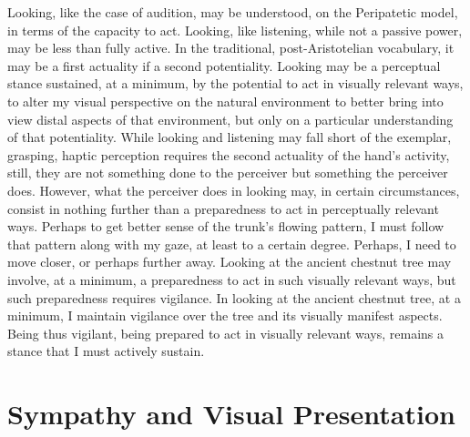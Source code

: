 Looking, like the case of audition, may be understood, on the Peripatetic model, in terms of the capacity to act. Looking, like listening, while not a passive power, may be less than fully active. In the traditional, post-Aristotelian vocabulary, it may be a first actuality if a second potentiality. Looking may be a perceptual stance sustained, at a minimum, by the potential to act in visually relevant ways, to alter my visual perspective on the natural environment to better bring into view distal aspects of that environment, but only on a particular understanding of that potentiality. While looking and listening may fall short of the exemplar, grasping, haptic perception requires the second actuality of the hand's activity, still, they are not something done to the perceiver but something the perceiver does. However, what the perceiver does in looking may, in certain circumstances, consist in nothing further than a preparedness to act in perceptually relevant ways. Perhaps to get better sense of the trunk's flowing pattern, I must follow that pattern along with my gaze, at least to a certain degree. Perhaps, I need to move closer, or perhaps further away. Looking at the ancient chestnut tree may involve, at a minimum, a preparedness to act in such visually relevant ways, but such preparedness requires vigilance. In looking at the ancient chestnut tree, at a minimum, I maintain vigilance over the tree and its visually manifest aspects. Being thus vigilant, being prepared to act in visually relevant ways, remains a stance that I must actively sustain.


\section{Sympathy and Visual Presentation} %
\label{sec:sympathy_and_visual_presentation}






